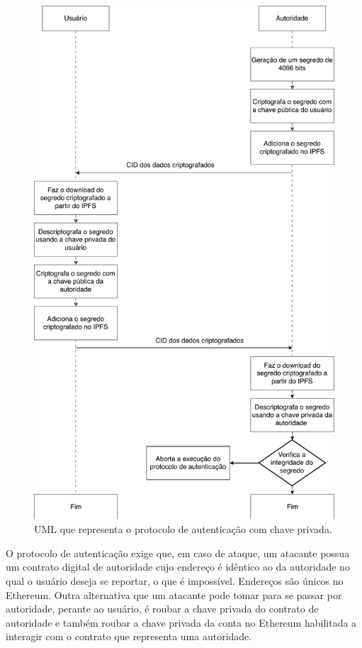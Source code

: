 \documentclass[tcc,capa]{texufpel}
\begin{document}
        \begin{figure}[]
            \centering
            \includegraphics[scale=0.75]{imagens/protocolo-handshake-com-chave-privada.pdf}
            \caption{UML que representa o protocolo de autenticação com chave privada.}
            \label{fig:handshake-com-chave}
        \end{figure}
        
        O protocolo de autenticação exige que, em caso de ataque, um atacante possua um contrato digital de autoridade cujo endereço é idêntico ao da autoridade no qual o usuário deseja se reportar, o que é impossível. Endereços são únicos no Ethereum. Outra alternativa que um atacante pode tomar para se passar por autoridade, perante ao usuário, é roubar a chave privada do contrato de autoridade e também roubar a chave privada da conta no Ethereum habilitada a interagir com o contrato que representa uma autoridade.
        
\end{document}
